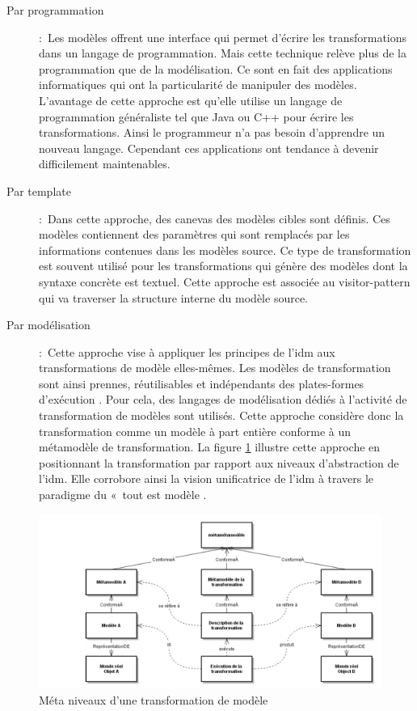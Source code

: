\begin{description}

\item[Par programmation]:~Les modèles offrent une interface qui permet d'écrire les transformations dans 
un langage de programmation. Mais cette technique relève plus de la 
programmation que de la modélisation. Ce sont en fait des applications 
informatiques qui ont la particularité de manipuler des modèles. L'avantage de 
cette approche est qu'elle utilise un langage de programmation généraliste tel 
que Java ou C++ pour écrire les transformations. Ainsi le programmeur n'a pas 
besoin d'apprendre un nouveau langage. Cependant ces applications ont tendance à 
devenir difficilement maintenables.

\item [Par template]:~Dans cette approche, des canevas des modèles cibles sont définis. Ces modèles contiennent des paramètres qui sont remplacés par les informations contenues 
dans les modèles source. Ce type de transformation est souvent utilisé pour les 
transformations qui génère des modèles dont la syntaxe concrète  est textuel.  Cette approche est associée au visitor-pattern qui va traverser la structure interne du modèle source. 

\item [Par modélisation]:~Cette approche vise à appliquer les principes de l'\gls{idm} aux transformations de modèle elles-mêmes. Les modèles de transformation sont ainsi prennes, réutilisables et indépendants des plates-formes d'exécution  \cite{bezivin2006model}. Pour cela, des langages de modélisation dédiés à l'activité de transformation de modèles sont utilisés. Cette approche considère donc la transformation comme 
un modèle à part entière conforme à un métamodèle de transformation. La figure 
\ref{fig:TransfoPrincipe} illustre cette approche en positionnant la transformation par rapport aux niveaux d'abstraction de l'\gls{idm}. Elle corrobore 
ainsi la vision unificatrice de l'\gls{idm} à travers le paradigme du «~tout est 
modèle \cite{bezivin2005unification}.
\end{description}


\begin{figure}[!htbp]
 \begin{center}
  \includegraphics[width=1\textwidth]{figures/3_etat_de_l_art_IDM/transfoPrincipe.png}
 \end{center}
 \caption{Méta niveaux d'une transformation de modèle}
 \label{fig:TransfoPrincipe}
\end{figure}


